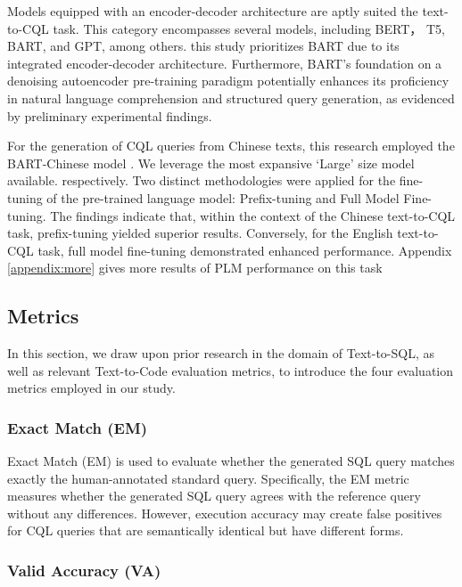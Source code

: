 \documentclass[11pt]{article}
\begin{document}
\begin{CJK*}{UTF8}{gbsn}
Models equipped with an encoder-decoder architecture are aptly suited the text-to-CQL task. This category encompasses several models, including BERT\citep{devlin2018bert}， T5\citep{t5}, BART\citep{bart}, and  GPT\citep{radford2019gpt}, among others. this study prioritizes BART due to its integrated encoder-decoder architecture. Furthermore, BART's foundation on a denoising autoencoder pre-training paradigm potentially enhances its proficiency in natural language comprehension and structured query generation, as evidenced by preliminary experimental findings.

For the generation of CQL queries from Chinese texts, this research employed the BART-Chinese model \citep{shao2021bartlargechinese}. We leverage the most expansive `Large' size model available. respectively. Two distinct methodologies were applied for the fine-tuning of the pre-trained language model: Prefix-tuning and Full Model Fine-tuning. The findings indicate that, within the context of the Chinese text-to-CQL task, prefix-tuning yielded superior results. Conversely, for the English text-to-CQL task, full model fine-tuning demonstrated enhanced performance. Appendix \ref{appendix:more} gives more results of PLM performance on this task


\subsection{Metrics}

In this section, we draw upon prior research in the domain of Text-to-SQL, as well as relevant Text-to-Code evaluation metrics, to introduce the four evaluation metrics employed in our study.

\subsubsection{Exact Match (EM)}

Exact Match (EM) is used to evaluate whether the generated SQL query matches exactly the human-annotated standard query. Specifically, the EM metric measures whether the generated SQL query agrees with the reference query without any differences. 
However, execution accuracy may create false positives for CQL queries that are semantically identical but have different forms\citep{yu2018spider, deng-etal-2022-recent}.  

\subsubsection{Valid Accuracy (VA)}


\end{CJK*}
\end{document}
